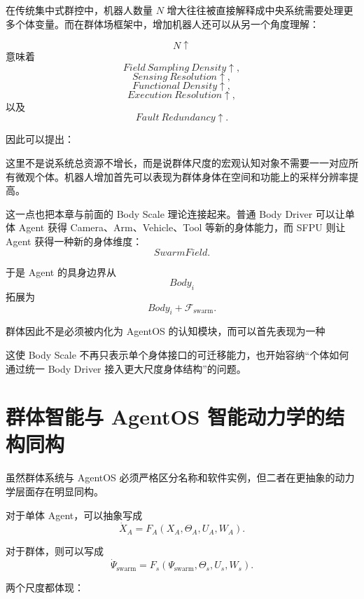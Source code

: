 在传统集中式群控中，机器人数量 $N$ 增大往往被直接解释成中央系统需要处理更多个体变量。而在群体场框架中，增加机器人还可以从另一个角度理解：

\[
N\uparrow
\]
意味着
\[
Field\ Sampling\ Density\uparrow,
\]
\[
Sensing\ Resolution\uparrow,
\]
\[
Functional\ Density\uparrow,
\]
\[
Execution\ Resolution\uparrow,
\]
以及
\[
Fault\ Redundancy\uparrow.
\]

因此可以提出：
\begin{statementbox}
\centering
{}
\end{statementbox}

这里不是说系统总资源不增长，而是说群体尺度的宏观认知对象不需要一一对应所有微观个体。机器人增加首先可以表现为群体身体在空间和功能上的采样分辨率提高。

这一点也把本章与前面的 Body Scale 理论连接起来。普通 Body Driver 可以让单体 Agent 获得 Camera、Arm、Vehicle、Tool 等新的身体能力，而 SFPU 则让 Agent 获得一种新的身体维度：
\[
SwarmField.
\]

于是 Agent 的具身边界从
\[
Body_i
\]
拓展为
\[
Body_i
+
\mathcal F_{\mathrm{swarm}}.
\]

群体因此不是必须被内化为 AgentOS 的认知模块，而可以首先表现为一种
\begin{statementbox}
\centering
{}
\end{statementbox}
这使 Body Scale 不再只表示单个身体接口的可迁移能力，也开始容纳“个体如何通过统一 Body Driver 接入更大尺度身体结构”的问题。


\section{群体智能与 AgentOS 智能动力学的结构同构}

虽然群体系统与 AgentOS 必须严格区分名称和软件实例，但二者在更抽象的动力学层面存在明显同构。

对于单体 Agent，可以抽象写成
\[
\dot X_A
=
F_A(
X_A,
\Theta_A,
U_A,
W_A
).
\]

对于群体，则可以写成
\[
\dot\Psi_{\mathrm{swarm}}
=
F_s(
\Psi_{\mathrm{swarm}},
\Theta_s,
U_s,
W_s
).
\]

两个尺度都体现：
\begin{statementbox}
\centering
{}
\end{statementbox}

